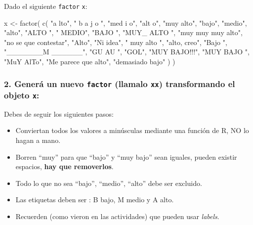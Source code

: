 \documentclass[
]{article}
\newenvironment{Shaded}{\begin{snugshade}}{\end{snugshade}}
\newcommand{\FunctionTok}[1]{\textcolor[rgb]{0.00,0.00,0.00}{#1}}
\newcommand{\NormalTok}[1]{#1}
\newcommand{\OtherTok}[1]{\textcolor[rgb]{0.56,0.35,0.01}{#1}}
\newcommand{\StringTok}[1]{\textcolor[rgb]{0.31,0.60,0.02}{#1}}
\providecommand{\tightlist}{%
  \setlength{\itemsep}{0pt}\setlength{\parskip}{0pt}}
\begin{document}
Dado el siguiente \texttt{factor} \texttt{x}:

\begin{Shaded}
\begin{Highlighting}[]
\NormalTok{x }\OtherTok{\textless{}{-}}
   \FunctionTok{factor}\NormalTok{(}
      \FunctionTok{c}\NormalTok{(}
         \StringTok{"a lto"}\NormalTok{,}
         \StringTok{" b a j o "}\NormalTok{,}
         \StringTok{"med i          o"}\NormalTok{,}
         \StringTok{"alt o"}\NormalTok{,}
         \StringTok{"muy alto"}\NormalTok{,}
         \StringTok{"bajo"}\NormalTok{,}
         \StringTok{"medio"}\NormalTok{,}
         \StringTok{"alto"}\NormalTok{,}
         \StringTok{"ALTO "}\NormalTok{,}
         \StringTok{"  MEDIO"}\NormalTok{,}
         \StringTok{"BAJO  "}\NormalTok{,}
         \StringTok{"MUY\_ ALTO "}\NormalTok{,}
         \StringTok{"muy muy muy alto"}\NormalTok{,}
         \StringTok{"no se que contestar"}\NormalTok{,}
         \StringTok{"Alto"}\NormalTok{,}
         \StringTok{"Ni idea"}\NormalTok{,}
         \StringTok{" muy alto "}\NormalTok{,}
         \StringTok{"alto, creo"}\NormalTok{,}
         \StringTok{"Bajo "}\NormalTok{,}
         \StringTok{"\_\_\_\_\_\_\_M \_\_\_\_\_\_"}\NormalTok{,}
         \StringTok{"GU    AU    "}\NormalTok{,}
         \StringTok{"GOL"}\NormalTok{,}
         \StringTok{"MUY BAJO!!!"}\NormalTok{,}
         \StringTok{"MUY BAJO                         "}\NormalTok{,}
         \StringTok{"MuY AlTo"}\NormalTok{,}
         \StringTok{"Me parece que alto"}\NormalTok{,}
         \StringTok{"demasiado bajo"}
\NormalTok{      )}
\NormalTok{   )}
\end{Highlighting}
\end{Shaded}

\hypertarget{generuxe1-un-nuevo-factor-llamalo-xx-transformando-el-objeto-x}{%
\subsubsection{\texorpdfstring{2. Generá un nuevo \texttt{factor}
(llamalo \texttt{xx}) transformando el objeto
\texttt{x}:}{2. Generá un nuevo factor (llamalo xx) transformando el objeto x:}}\label{generuxe1-un-nuevo-factor-llamalo-xx-transformando-el-objeto-x}}

Debes de seguir los siguientes pasos:

\begin{itemize}
\tightlist
\item
  Conviertan todos los valores a minúsculas mediante una función de R,
  NO lo hagan a mano.
\item
  Borren ``muy'' para que ``bajo'' y ``muy bajo'' sean iguales, pueden
  existir espacios, \textbf{hay que removerlos}.
\item
  Todo lo que no sea ``bajo'', ``medio'', ``alto'' debe ser excluido.
\item
  Las etiquetas deben ser : B bajo, M medio y A alto.
\item
  Recuerden (como vieron en las actividades) que pueden usar
  \emph{labels}.
\end{itemize}
\end{document}

